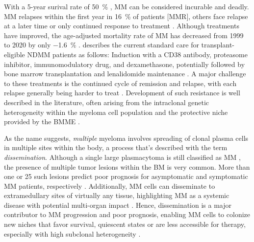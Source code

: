With a 5-year surival rate of \SI{50}{\percent}
\cite{turessonRapidlyChangingMyeloma2018}, \ac{MM} can be considered incurable
and deadly. \ac{MM} relapses within the first year in \SI{16}{\percent} of
patients [\ac{MMR}], others face relapse at a later time or only continued
response to treatment \cite{majithiaEarlyRelapseFollowing2016}. Although
treatments have improved, the age-adjusted mortality rate of \ac{MM} has
decreased from 1999 to 2020 by only \SI{-1.6}{\percent}
\cite{doddiDisparitiesMultipleMyeloma2024}.
\citet{engelhardtFunctionalCureLongterm2024} describes the current standard care
for transplant-eligible \ac{NDMM} patients as follows: Induction
with a CD38 antibody, proteasome inhibitor, immunomodulatory drug, and
dexamethasone, potentially followed by bone marrow transplantation and
lenalidomide maintenance \cite{rajkumarMultipleMyelomaCurrent2020}. A major
challenge to these treatments is the continued cycle of remission and relapse,
with each relapse generally being harder to treat
\cite{podarRelapsedRefractoryMultiple2021}. Development of such resistance is
well described in the literature, often arising from the intraclonal genetic
heterogeneity within the myeloma cell population and the protective niche
provided by the \ac{BMME}
\cite{solimandoDrugResistanceMultiple2022}.



%
\label{sec:intro_myeloma_dissemination}%
As the name suggests, \emph{multiple} myeloma involves spreading of clonal
plasma cells in multiple sites within the body, a process that's described with
the term \emph{dissemination}. Although a single large plasmacytoma is still
classified as \ac{MM} \cite{rajkumarInternationalMyelomaWorking2014}, the
presence of multiple tumor lesions within the \ac{BM} is very common. More than
one or 25 such lesions predict poor prognosis for asymptomatic and symptomatic
\ac{MM} patients, respectively \cite{kastritisPrognosticImportancePresence2014,
    maiMagneticResonanceImagingbased2015a}. Additionally, \ac{MM} cells can
disseminate to extramedullary sites of virtually any tissue, highlighting
\ac{MM} as a systemic disease with potential multi-organ impact
\cite{rajkumarMultipleMyelomaCurrent2020,
    bladeExtramedullaryDiseaseMultiple2022}. Hence, dissemination is a major
contributor to \ac{MM} progression and poor prognosis, enabling \ac{MM} cells to
colonize new niches that favor survival, quiescent states or are less accessible
for therapy, especially with high subclonal heterogeneity
\cite{forsterMolecularImpactTumor2022, keatsClonalCompetitionAlternating2012}.

